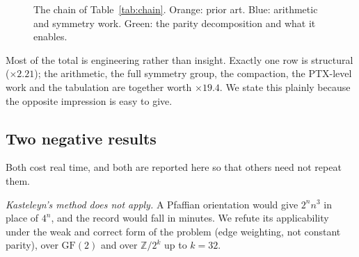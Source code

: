 \documentclass[11pt,a4paper]{article}
\begin{document}
\begin{figure}[t]
\centering
{}
\caption{The chain of Table~\ref{tab:chain}. Orange: prior art. Blue: arithmetic
and symmetry work. Green: the parity decomposition and what it enables.}
\label{fig:waterfall}
\end{figure}

Most of the total is engineering rather than insight. Exactly one row is
structural ($\times 2.21$); the arithmetic, the full symmetry group, the
compaction, the PTX-level work and the tabulation are together worth
$\times 19.4$. We state this plainly because the opposite impression is easy to
give.

\subsection{Two negative results}

Both cost real time, and both are reported here so that others need not repeat
them.

\emph{Kasteleyn's method does not apply.} A Pfaffian orientation would give
$2^n n^3$ in place of $4^n$, and the record would fall in minutes. We refute its
applicability under the weak and correct form of the problem (edge weighting,
not constant parity), over $\mathrm{GF}(2)$ and over $\mathbb{Z}/2^k$ up to
$k=32$.
\end{document}
